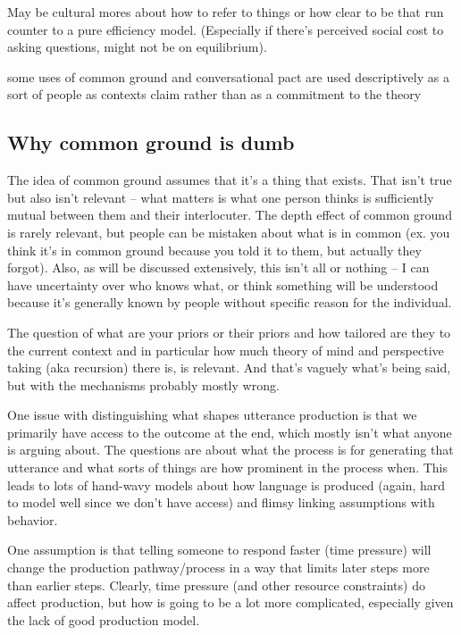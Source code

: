 \documentclass[]{article}
\begin{document}
May be cultural mores about how to refer to things or how clear to be that run counter to a pure efficiency model. (Especially if there's perceived social cost to asking questions, might not be on equilibrium). 

some uses of common ground and conversational pact are used descriptively as a sort of people as contexts claim \cite{leung2023} rather than as a commitment to the theory 

\subsection{Why common ground is dumb}

The idea of common ground assumes that it's a thing that exists. That isn't true but also isn't relevant -- what matters is what one person thinks is sufficiently mutual between them and their interlocuter. The depth effect of common ground is rarely relevant, but people can be mistaken about what is in common (ex. you think it's in common ground because you told it to them, but actually they forgot). Also, as will be discussed extensively, this isn't all or nothing -- I can have uncertainty over who knows what, or think something will be understood because it's generally known by people without specific reason for the individual. 

The question of what are your priors or their priors and how tailored are they to the current context and in particular how much theory of mind and perspective taking (aka recursion) there is, is relevant. And that's vaguely what's being said, but with the mechanisms probably mostly wrong. 

One issue with distinguishing what shapes utterance production is that we primarily have access to the outcome at the end, which mostly isn't what anyone is arguing about. The questions are about what the process is for generating that utterance and what sorts of things are how prominent in the process when. This leads to lots of hand-wavy models about how language is produced (again, hard to model well since we don't have access) and flimsy linking assumptions with behavior. 

One assumption is that telling someone to respond faster (time pressure) will change the production pathway/process in a way that limits later steps more than earlier steps. Clearly, time pressure (and other resource constraints) do affect production, but how is going to be a lot more complicated, especially given the lack of good production model. 
\end{document}
